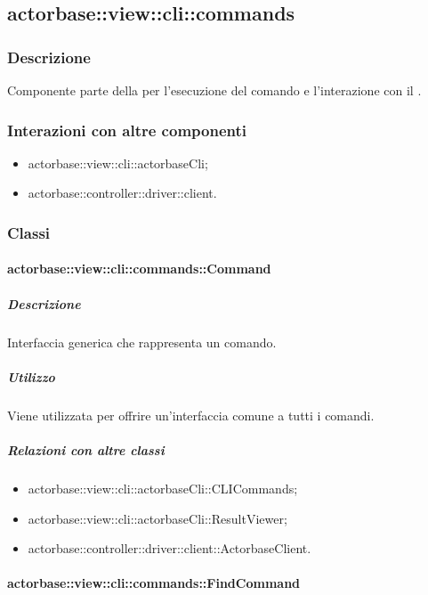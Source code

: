 \documentclass{scalatekids-article}
\begin{document}
\subsection{actorbase::view::cli::commands}

\subsubsection{Descrizione}

Componente parte della  per l'esecuzione del comando e l'interazione con il .

\subsubsection{Interazioni con altre componenti}

\begin{itemize}
\item actorbase::view::cli::actorbaseCli;
\item actorbase::controller::driver::client.
\end{itemize}

\subsubsection{Classi}

\paragraph{actorbase::view::cli::commands::Command}

\subparagraph{Descrizione}

Interfaccia generica che rappresenta un comando.

\subparagraph{Utilizzo}

Viene utilizzata per offrire un'interfaccia comune a tutti i comandi.

\subparagraph{Relazioni con altre classi}

\begin{itemize}
\item actorbase::view::cli::actorbaseCli::CLICommands;
\item actorbase::view::cli::actorbaseCli::ResultViewer;
\item actorbase::controller::driver::client::ActorbaseClient.
\end{itemize}

\paragraph{actorbase::view::cli::commands::FindCommand}
\end{document}
